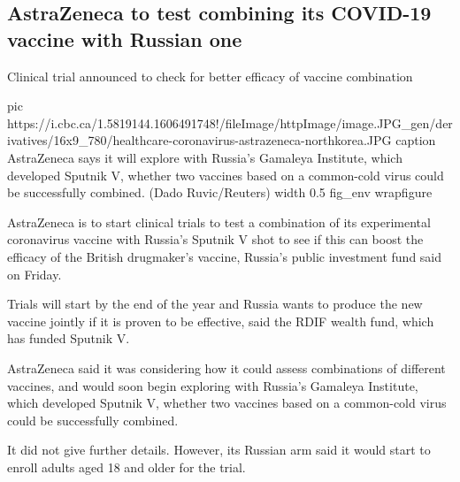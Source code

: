  
 
 
 
 
 
\subsection{AstraZeneca to test combining its COVID-19 vaccine with Russian one}
\label{sec:11_12_2020.news.world.cbc_ca.1.astrazeneca_sputnik_v}

Clinical trial announced to check for better efficacy of vaccine combination

\ifcmt
  pic https://i.cbc.ca/1.5819144.1606491748!/fileImage/httpImage/image.JPG_gen/derivatives/16x9_780/healthcare-coronavirus-astrazeneca-northkorea.JPG
  caption AstraZeneca says it will explore with Russia's Gamaleya Institute, which developed Sputnik V, whether two vaccines based on a common-cold virus could be successfully combined. (Dado Ruvic/Reuters)
  width 0.5
  fig_env wrapfigure
\fi

AstraZeneca is to start clinical trials to test a combination of its
experimental coronavirus vaccine with Russia's Sputnik V shot to see if this
can boost the efficacy of the British drugmaker's vaccine, Russia's public
investment fund said on Friday.

Trials will start by the end of the year and Russia wants to produce the new
vaccine jointly if it is proven to be effective, said the RDIF wealth fund,
which has funded Sputnik V.

AstraZeneca said it was considering how it could assess combinations of
different vaccines, and would soon begin exploring with Russia's Gamaleya
Institute, which developed Sputnik V, whether two vaccines based on a
common-cold virus could be successfully combined.

It did not give further details. However, its Russian arm said it would start
to enroll adults aged 18 and older for the trial.

